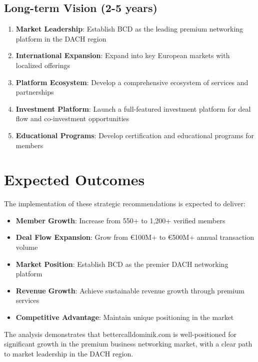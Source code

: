 \subsection{Long-term Vision (2-5 years)}
\begin{enumerate}
    \item \textbf{Market Leadership}: Establish BCD as the leading premium networking platform in the DACH region
    \item \textbf{International Expansion}: Expand into key European markets with localized offerings
    \item \textbf{Platform Ecosystem}: Develop a comprehensive ecosystem of services and partnerships
    \item \textbf{Investment Platform}: Launch a full-featured investment platform for deal flow and co-investment opportunities
    \item \textbf{Educational Programs}: Develop certification and educational programs for members
\end{enumerate}

\section{Expected Outcomes}

The implementation of these strategic recommendations is expected to deliver:

\begin{itemize}
    \item \textbf{Member Growth}: Increase from 550+ to 1,200+ verified members
    \item \textbf{Deal Flow Expansion}: Grow from €100M+ to €500M+ annual transaction volume
    \item \textbf{Market Position}: Establish BCD as the premier DACH networking platform
    \item \textbf{Revenue Growth}: Achieve sustainable revenue growth through premium services
    \item \textbf{Competitive Advantage}: Maintain unique positioning in the market
\end{itemize}

The analysis demonstrates that bettercalldominik.com is well-positioned for significant growth in the premium business networking market, with a clear path to market leadership in the DACH region. 